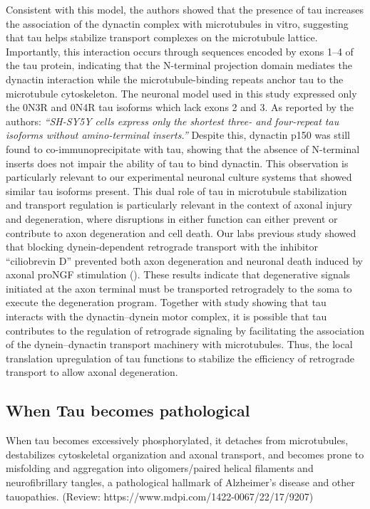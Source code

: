 \documentclass[
  letterpaper,
  DIV=11,
  numbers=noendperiod]{scrreprt}
\begin{document}
Consistent with this model, the authors showed that the presence of tau
increases the association of the dynactin complex with microtubules in
vitro, suggesting that tau helps stabilize transport complexes on the
microtubule lattice. Importantly, this interaction occurs through
sequences encoded by exons 1--4 of the tau protein, indicating that the
N-terminal projection domain mediates the dynactin interaction while the
microtubule-binding repeats anchor tau to the microtubule cytoskeleton.
The neuronal model used in this study expressed only the 0N3R and 0N4R
tau isoforms which lack exons 2 and 3. As reported by the authors:
\emph{``SH-SY5Y cells express only the shortest three- and four-repeat
tau isoforms without amino-terminal inserts.''} Despite this, dynactin
p150 was still found to co-immunoprecipitate with tau, showing that the
absence of N-terminal inserts does not impair the ability of tau to bind
dynactin. This observation is particularly relevant to our experimental
neuronal culture systems that showed similar tau isoforms present. This
dual role of tau in microtubule stabilization and transport regulation
is particularly relevant in the context of axonal injury and
degeneration, where disruptions in either function can either prevent or
contribute to axon degeneration and cell death. Our labs previous study
showed that blocking dynein-dependent retrograde transport with the
inhibitor ``ciliobrevin D'' prevented both axon degeneration and
neuronal death induced by axonal proNGF stimulation
(). These results indicate that degenerative signals initiated at
the axon terminal must be transported retrogradely to the soma to
execute the degeneration program. Together with study showing that tau
interacts with the dynactin--dynein motor complex, it is possible that
tau contributes to the regulation of retrograde signaling by
facilitating the association of the dynein--dynactin transport machinery
with microtubules. Thus, the local translation upregulation of tau
functions to stabilize the efficiency of retrograde transport to allow
axonal degeneration.

\subsection{When Tau becomes
pathological}\label{when-tau-becomes-pathological}

When tau becomes excessively phosphorylated, it detaches from
microtubules, destabilizes cytoskeletal organization and axonal
transport, and becomes prone to misfolding and aggregation into
oligomers/paired helical filaments and neurofibrillary tangles, a
pathological hallmark of Alzheimer's disease and other tauopathies.
(Review: https://www.mdpi.com/1422-0067/22/17/9207)
\end{document}
